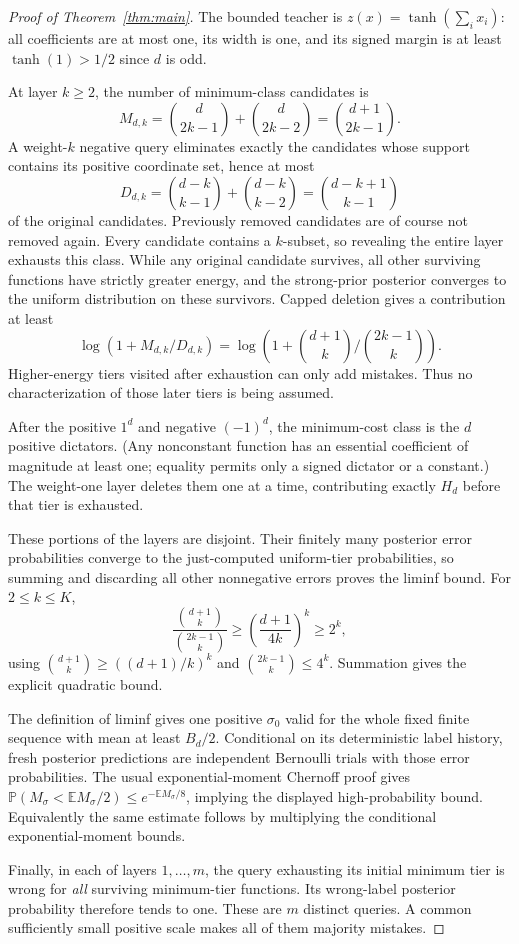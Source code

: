 \documentclass[11pt]{article}
\begin{document}
\begin{proof}[Proof of Theorem~\ref{thm:main}]
The bounded teacher is $z(x)=\tanh(\sum_i x_i)$: all coefficients are at most one, its width is one, and its signed margin is at least $\tanh(1)>1/2$ since $d$ is odd.

At layer $k\ge2$, the number of minimum-class candidates is
\[
 M_{d,k}=\binom d{2k-1}+\binom d{2k-2}=\binom{d+1}{2k-1}.
\]
A weight-$k$ negative query eliminates exactly the candidates whose support contains its positive coordinate set, hence at most
\[
 D_{d,k}=\binom{d-k}{k-1}+\binom{d-k}{k-2}
        =\binom{d-k+1}{k-1}
\]
of the original candidates. Previously removed candidates are of course not removed again. Every candidate contains a $k$-subset, so revealing the entire layer exhausts this class. While any original candidate survives, all other surviving functions have strictly greater energy, and the strong-prior posterior converges to the uniform distribution on these survivors. Capped deletion gives a contribution at least
\[
 \log(1+M_{d,k}/D_{d,k})
 =\log\!\left(1+\binom{d+1}{k}/\binom{2k-1}{k}\right).
\]
Higher-energy tiers visited after exhaustion can only add mistakes. Thus no characterization of those later tiers is being assumed.

After the positive $1^d$ and negative $(-1)^d$, the minimum-cost class is the $d$ positive dictators. (Any nonconstant function has an essential coefficient of magnitude at least one; equality permits only a signed dictator or a constant.) The weight-one layer deletes them one at a time, contributing exactly $H_d$ before that tier is exhausted.

These portions of the layers are disjoint. Their finitely many posterior error probabilities converge to the just-computed uniform-tier probabilities, so summing and discarding all other nonnegative errors proves the liminf bound. For $2\le k\le K$,
\[
 \frac{\binom{d+1}{k}}{\binom{2k-1}{k}}
 \ge\left(\frac{d+1}{4k}\right)^k\ge2^k,
\]
using $\binom{d+1}{k}\ge((d+1)/k)^k$ and $\binom{2k-1}{k}\le4^k$. Summation gives the explicit quadratic bound.

The definition of liminf gives one positive $\sigma_0$ valid for the whole fixed finite sequence with mean at least $B_d/2$. Conditional on its deterministic label history, fresh posterior predictions are independent Bernoulli trials with those error probabilities. The usual exponential-moment Chernoff proof gives $\mathbb P(M_\sigma<\mathbb E M_\sigma/2)\le e^{-\mathbb E M_\sigma/8}$, implying the displayed high-probability bound. Equivalently the same estimate follows by multiplying the conditional exponential-moment bounds.

Finally, in each of layers $1,\ldots,m$, the query exhausting its initial minimum tier is wrong for \emph{all} surviving minimum-tier functions. Its wrong-label posterior probability therefore tends to one. These are $m$ distinct queries. A common sufficiently small positive scale makes all of them majority mistakes.
\end{proof}
\end{document}
